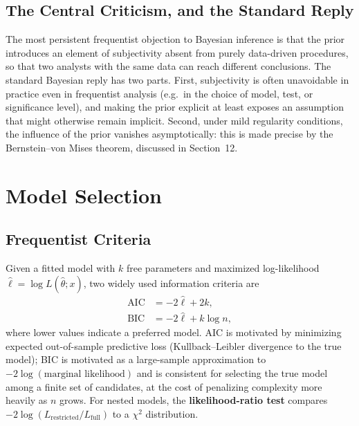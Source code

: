\documentclass[11pt,a4paper]{article}
\begin{document}
\subsection{The Central Criticism, and the Standard Reply}
The most persistent frequentist objection to Bayesian inference is that the prior introduces an element of subjectivity absent from purely data-driven procedures, so that two analysts with the same data can reach different conclusions. The standard Bayesian reply has two parts. First, subjectivity is often unavoidable in practice even in frequentist analysis (e.g.\ in the choice of model, test, or significance level), and making the prior explicit at least exposes an assumption that might otherwise remain implicit. Second, under mild regularity conditions, the influence of the prior vanishes asymptotically: this is made precise by the Bernstein--von Mises theorem, discussed in Section~12.

\section{Model Selection}

\subsection{Frequentist Criteria}
Given a fitted model with $k$ free parameters and maximized log-likelihood $\hat\ell = \log L(\hat\theta; x)$, two widely used information criteria are
\begin{align}
\text{AIC} &= -2\hat\ell + 2k, \\
\text{BIC} &= -2\hat\ell + k \log n,
\end{align}
where lower values indicate a preferred model. AIC is motivated by minimizing expected out-of-sample predictive loss (Kullback--Leibler divergence to the true model); BIC is motivated as a large-sample approximation to $-2\log(\text{marginal likelihood})$ and is consistent for selecting the true model among a finite set of candidates, at the cost of penalizing complexity more heavily as $n$ grows. For nested models, the \textbf{likelihood-ratio test} compares $-2\log(L_{\text{restricted}}/L_{\text{full}})$ to a $\chi^2$ distribution.
\end{document}

